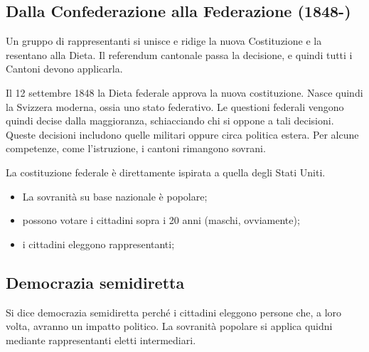 \documentclass[a4paper]{article}
\begin{document}
\pagebreak

\subsection{Dalla Confederazione alla Federazione (1848-)}

Un gruppo di rappresentanti si unisce e ridige la nuova Costituzione e la resentano alla Dieta.
Il referendum cantonale passa la decisione, e quindi tutti i Cantoni devono applicarla.

Il 12 settembre 1848 la Dieta federale approva la nuova costituzione.
Nasce quindi la Svizzera moderna, ossia uno stato federativo.
Le questioni federali vengono quindi decise dalla maggioranza, schiacciando chi si oppone a tali decisioni.
Queste decisioni includono quelle militari oppure circa politica estera.
Per alcune competenze, come l'istruzione, i cantoni rimangono sovrani.

La costituzione federale è direttamente ispirata a quella degli Stati Uniti.
\begin{itemize}
    \item La sovranità su base nazionale è popolare;
    \item possono votare i cittadini sopra i 20 anni (maschi, ovviamente);
    \item i cittadini eleggono rappresentanti;
\end{itemize}


\subsection{Democrazia semidiretta}

Si dice democrazia semidiretta perché i cittadini eleggono persone che, a loro volta,
avranno un impatto politico.
La sovranità popolare si applica quidni mediante rappresentanti eletti intermediari.
\end{document}
